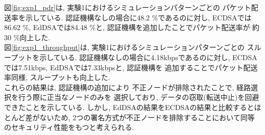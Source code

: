 \indent 図\ref{fig:exp1_pdr}は, 実験1におけるシミュレーションパターンごとの
パケット配送率を示している. 認証機構なしの場合に48.2 \%であるのに対し, 
ECDSAでは86.62 \%, EdDSAでは84.48 \%と, 認証機構を追加したことでパケット配送率が
約30 \%向上した. \\
\indent 図\ref{fig:exp1_throughput}は, 実験1におけるシミュレーションパターンごとの
スループットを示している. 認証機構なしの場合に4.18kbpsであるのに対し, 
ECDSAでは7.51kbps, EdDSAでは7.33kbpsと, 認証機構を
追加することでパケット配送率同様, スループットも向上した. \\
\indent これらの結果は, 認証機構の追加により 
不正ノードが排除されたことで, 経路選択を行う際に正当なノードのみを
選択しており,  データの窃取(転送中止)を回避できたことを示している. 
しかし, EdDSAの結果をECDSAの結果と比較するとほとんど差がないため, 
2つの署名方式が不正ノードを排除することにおいて同等のセキュリティ性能をもつと考えられる. 



